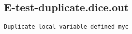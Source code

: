 \subsection{E-test-duplicate.dice.out}
\begin{verbatim}
Duplicate local variable defined myc

\end{verbatim}